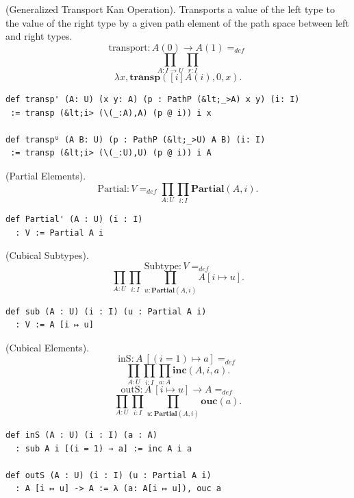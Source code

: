 \documentclass{article}
\begin{document}
\newpage

\begin{definition} (Generalized Transport Kan Operation).
Transports a value of the left type to the value of the right type
by a given path element of the path space between left and right types.
$$
  \mathrm{transport} : A(0) \rightarrow A(1) =_{def}
$$
$$
  \prod_{A:I\rightarrow U}\prod_{r:I}
$$
$$
  \lambda x,\mathbf{transp}([i]A(i),0,x).
$$
\begin{lstlisting}[mathescape=true]
def transp' (A: U) (x y: A) (p : PathP (&lt;_>A) x y) (i: I)
 := transp (&lt;i> (\(_:A),A) (p @ i)) i x

def transpᵁ (A B: U) (p : PathP (&lt;_>U) A B) (i: I)
 := transp (&lt;i> (\(_:U),U) (p @ i)) i A
\end{lstlisting}
\end{definition}

\begin{definition} (Partial Elements).
$$
  \mathrm{Partial} : V =_{def} \prod_{A:U}\prod_{i:I}\mathbf{Partial}(A,i).
$$
\begin{lstlisting}[mathescape=true]
def Partial' (A : U) (i : I)
  : V := Partial A i
\end{lstlisting}
\end{definition}

\begin{definition} (Cubical Subtypes).
$$
  \mathrm{Subtype} : V =_{def}
$$
$$
  \prod_{A:U}\prod_{i:I}\prod_{u:\mathbf{Partial}(A,i)}A[i \mapsto u].
$$
\begin{lstlisting}[mathescape=true]
def sub (A : U) (i : I) (u : Partial A i)
  : V := A [i ↦ u]
\end{lstlisting}
\end{definition}

\begin{definition} (Cubical Elements).
$$
  \mathrm{inS} :  A\ [(i=1) \mapsto a ] =_{def}
$$
$$
  \prod_{A:U}\prod_{i:I}\prod_{a:A}\mathbf{inc}(A,i,a).
$$
$$
  \mathrm{outS} : A\ [i \mapsto u] \rightarrow A =_{def}
$$
$$
  \prod_{A:U}\prod_{i:I}\prod_{u:\mathbf{Partial}(A,i)}
  \mathbf{ouc}(a).
$$
\begin{lstlisting}[mathescape=true]
def inS (A : U) (i : I) (a : A)
  : sub A i [(i = 1) → a] := inc A i a

def outS (A : U) (i : I) (u : Partial A i)
  : A [i ↦ u] -> A := λ (a: A[i ↦ u]), ouc a
\end{lstlisting}
\end{definition}
\end{document}
